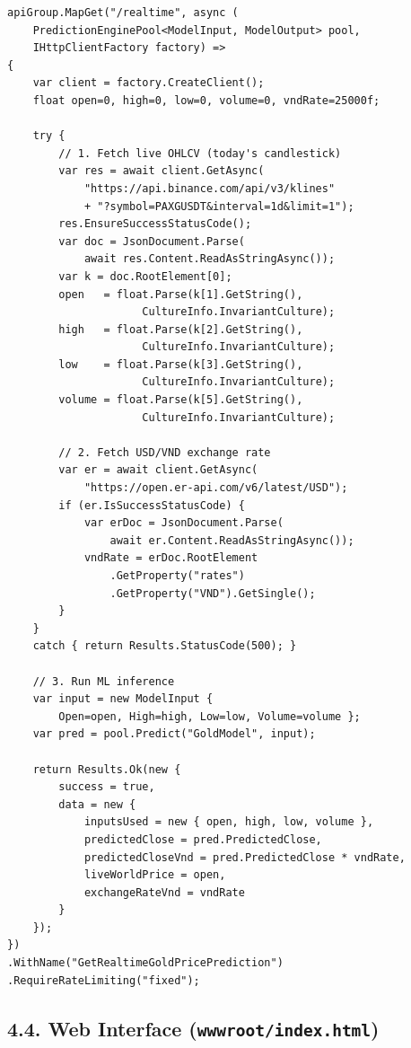 \begin{lstlisting}
apiGroup.MapGet("/realtime", async (
    PredictionEnginePool<ModelInput, ModelOutput> pool,
    IHttpClientFactory factory) =>
{
    var client = factory.CreateClient();
    float open=0, high=0, low=0, volume=0, vndRate=25000f;

    try {
        // 1. Fetch live OHLCV (today's candlestick)
        var res = await client.GetAsync(
            "https://api.binance.com/api/v3/klines"
            + "?symbol=PAXGUSDT&interval=1d&limit=1");
        res.EnsureSuccessStatusCode();
        var doc = JsonDocument.Parse(
            await res.Content.ReadAsStringAsync());
        var k = doc.RootElement[0];
        open   = float.Parse(k[1].GetString(),
                     CultureInfo.InvariantCulture);
        high   = float.Parse(k[2].GetString(),
                     CultureInfo.InvariantCulture);
        low    = float.Parse(k[3].GetString(),
                     CultureInfo.InvariantCulture);
        volume = float.Parse(k[5].GetString(),
                     CultureInfo.InvariantCulture);

        // 2. Fetch USD/VND exchange rate
        var er = await client.GetAsync(
            "https://open.er-api.com/v6/latest/USD");
        if (er.IsSuccessStatusCode) {
            var erDoc = JsonDocument.Parse(
                await er.Content.ReadAsStringAsync());
            vndRate = erDoc.RootElement
                .GetProperty("rates")
                .GetProperty("VND").GetSingle();
        }
    }
    catch { return Results.StatusCode(500); }

    // 3. Run ML inference
    var input = new ModelInput {
        Open=open, High=high, Low=low, Volume=volume };
    var pred = pool.Predict("GoldModel", input);

    return Results.Ok(new {
        success = true,
        data = new {
            inputsUsed = new { open, high, low, volume },
            predictedClose = pred.PredictedClose,
            predictedCloseVnd = pred.PredictedClose * vndRate,
            liveWorldPrice = open,
            exchangeRateVnd = vndRate
        }
    });
})
.WithName("GetRealtimeGoldPricePrediction")
.RequireRateLimiting("fixed");
\end{lstlisting}

\subsection{4.4. Web Interface (\texttt{wwwroot/index.html})}

